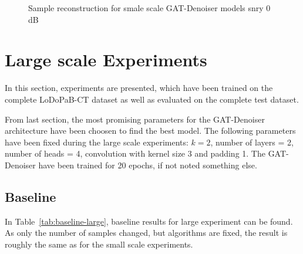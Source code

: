 \begin{figure}[H]
  \hfill
  \hfill
  \hfill
  \hfill
  \hfill
  \hfill
  \hfill
  \hfill
  \hfill
  \hfill
  \hfill
\caption{Sample reconstruction for smale scale GAT-Denoiser models snry 0 dB}
\end{figure}


\section{Large scale Experiments}

In this section, experiments are presented, which have been trained on the complete LoDoPaB-CT dataset
as well as evaluated on the complete test dataset.

From last section, the most promising parameters for the GAT-Denoiser architecture have been choosen
to find the best model. The following parameters have been fixed during the large scale experiments:
$k=2$, number of layers = 2, number of heads = 4, convolution with kernel size 3 and padding 1.
The GAT-Denoiser have been trained for 20 epochs, if not noted something else.


\subsection{Baseline}
In Table~\ref{tab:baseline-large}, baseline results for large experiment can be found.
As only the number of samples changed, but algorithms are fixed, the result is roughly 
the same as for the small scale experiments.


